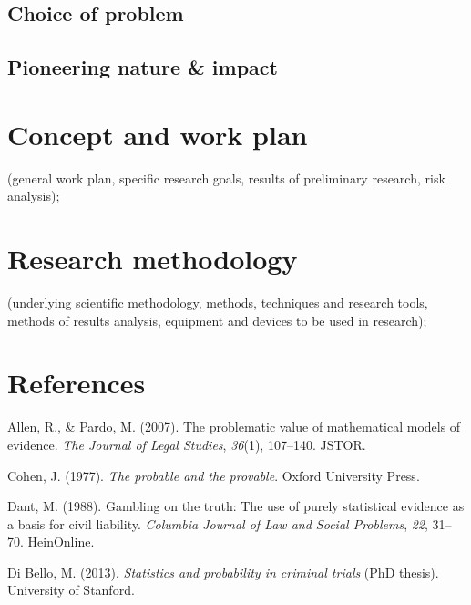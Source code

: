\documentclass[11pt,dvipsnames,enabledeprecatedfontcommands]{scrartcl}
\begin{document}

\subsection{Choice of problem}\label{choice-of-problem}

\subsection{Pioneering nature \& impact}\label{pioneering-nature-impact}

\section{Concept and work plan}\label{concept-and-work-plan}

(general work plan, specific research goals, results of preliminary
research, risk analysis);

\section{Research methodology}\label{research-methodology}

(underlying scientific methodology, methods, techniques and research
tools, methods of results analysis, equipment and devices to be used in
research);

\section*{References}\label{references}

\hypertarget{refs}{}
\hypertarget{ref-allen2007problematic}{}
Allen, R., \& Pardo, M. (2007). The problematic value of mathematical
models of evidence. \emph{The Journal of Legal Studies}, \emph{36}(1),
107--140. JSTOR.

\hypertarget{ref-Cohen1977The-probable-an}{}
Cohen, J. (1977). \emph{The probable and the provable}. Oxford
University Press.

\hypertarget{ref-dant1988gambling}{}
Dant, M. (1988). Gambling on the truth: The use of purely statistical
evidence as a basis for civil liability. \emph{Columbia Journal of Law
and Social Problems}, \emph{22}, 31--70. HeinOnline.

\hypertarget{ref-di2013statistics}{}
Di Bello, M. (2013). \emph{Statistics and probability in criminal
trials} (PhD thesis). University of Stanford.
\end{document}
